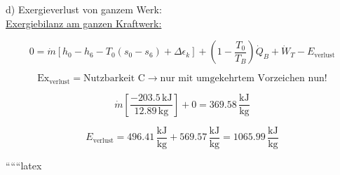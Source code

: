 d) Exergieverlust von ganzem Werk: \\
\underline{Exergiebilanz am ganzen Kraftwerk:}

\[
0 = \dot{m} \left[ h_0 - h_6 - T_0 (s_0 - s_6) + \Delta \epsilon_k \right] + \left( 1 - \frac{T_0}{T_B} \right) \dot{Q}_B + \dot{W}_T - E_{\text{verlust}}
\]

\[
\text{Ex}_{\text{verlust}} = \text{Nutzbarkeit C} \rightarrow \text{nur mit umgekehrtem Vorzeichen nun!}
\]

\[
\dot{m} \left[ \frac{-203.5 \, \text{kJ}}{12.89 \, \text{kg}} \right] + 0 = 369.58 \, \frac{\text{kJ}}{\text{kg}}
\]

\[
E_{\text{verlust}} = 496.41 \, \frac{\text{kJ}}{\text{kg}} + 569.57 \, \frac{\text{kJ}}{\text{kg}} = 1065.99 \, \frac{\text{kJ}}{\text{kg}}
\]

``````latex